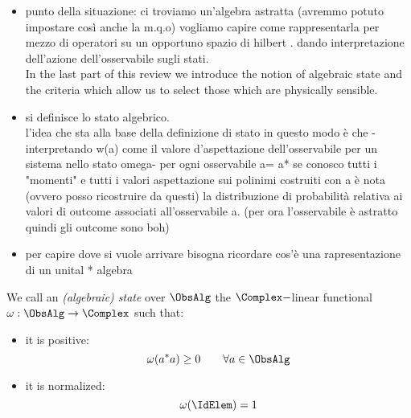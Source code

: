 \documentclass[Main]{subfiles}
\begin{document}
					\begin{Warning}
				\begin{itemize}
					\item punto della situazione: ci troviamo un'algebra astratta (avremmo potuto impostare così anche la m.q.o) vogliamo capire come rappresentarla per mezzo di operatori su un opportuno spazio di hilbert . 
					dando interpretazione dell'azione dell'osservabile sugli stati.\\
					In the last part of this review we introduce the notion of algebraic state and the criteria which allow us to select those which are physically sensible.
					\item si definisce lo stato algebrico.\\
						l'idea che sta alla base della definizione di stato in questo modo è che 
						 - interpretando w(a) come il valore d'aspettazione dell'osservabile per un sistema nello stato omega-  
						per ogni osservabile a= a*  se conosco tutti i "momenti" e tutti i valori aspettazione sui polinimi costruiti con a è nota (ovvero posso ricostruire da questi) la distribuzione di probabilità relativa ai valori di outcome associati all'osservabile a. (per ora l'osservabile è astratto quindi gli outcome sono boh)
					\item per capire dove si vuole arrivare bisogna ricordare cos'è una rapresentazione di un unital * algebra
						
				\end{itemize}
			\end{Warning}

				\begin{definition}
					We call an \emph{(algebraic) state} over $\ObsAlg$ the $\Complex-$linear functional $\omega: \ObsAlg \rightarrow \Complex$ such that:
					\begin{itemize}
						\item it is positive:
							$$ \omega( a^* a ) \geq 0 \qquad \forall a \in \ObsAlg$$
						\item it is normalized:
							$$ \omega(\IdElem) = 1 $$	
					\end{itemize}									
				\end{definition}
			
\end{document}
